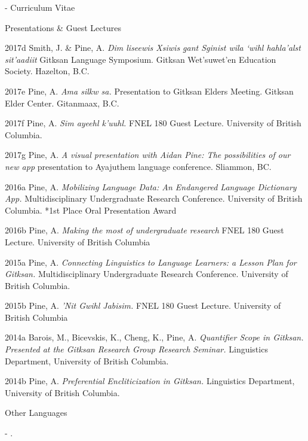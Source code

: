 \documentclass[12pt]{letter}
\begin{document}
\begin{cv}{     \space - \space   Curriculum Vitae}
\begin{cvlist}{Presentations \& Guest Lectures}
            \item[2017d] Smith, J. \& Pine, A. \textit{Dim liseewis Xsiwis g̲ant Sginist wila ‘wihl hahla’alst sit’aadiit}  Gitksan Language Symposium. Gitksan Wet'suwet'en Education Society. Hazelton, B.C.
            \item[2017e] Pine, A. \textit{Ama silkw sa.} Presentation to Gitksan Elders Meeting. Gitksan Elder Center. Gitanmaax, B.C.
            \item[2017f] Pine, A. \textit{Sim ayeehl k'uuhl.} FNEL 180 Guest Lecture. University of British Columbia.
            \item[2017g] Pine, A. \textit{A visual presentation with Aidan Pine: The possibilities of our new app} presentation to Ayajuthem language conference. Sliammon, BC.
            \item[2016a] Pine, A. \textit{Mobilizing Language Data: An Endangered Language Dictionary App.} Multidisciplinary Undergraduate Research Conference. University of British Columbia. *1st Place Oral Presentation Award
            \item[2016b] Pine, A. \textit{Making the most of undergraduate research}  FNEL 180 Guest Lecture. University of British Columbia
            
            \item[2015a] Pine, A. \textit{Connecting Linguistics to Language Learners: a Lesson Plan for Gitksan.} Multidisciplinary Undergraduate Research Conference. University of British Columbia.
            
            \item[2015b] Pine, A. \textit{'Nit Gwihl Jabisim.}  FNEL 180 Guest Lecture. University of British Columbia
            
            \item[2014a] Barois, M., Bicevskis, K., Cheng, K., Pine, A.
            \textit{Quantifier Scope in Gitksan. Presented at the Gitksan Research Group Research Seminar.} Linguistics Department, University of British Columbia. 
            
            \item[2014b] Pine, A. \textit{Preferential Encliticization in Gitksan.} \newline Linguistics Department, University of British Columbia.
            
        \end{cvlist}
        \begin{cvlist}{Other Languages}
                \item \textbf{} - . 
        \end{cvlist}
        

\end{cv}
\end{document}
